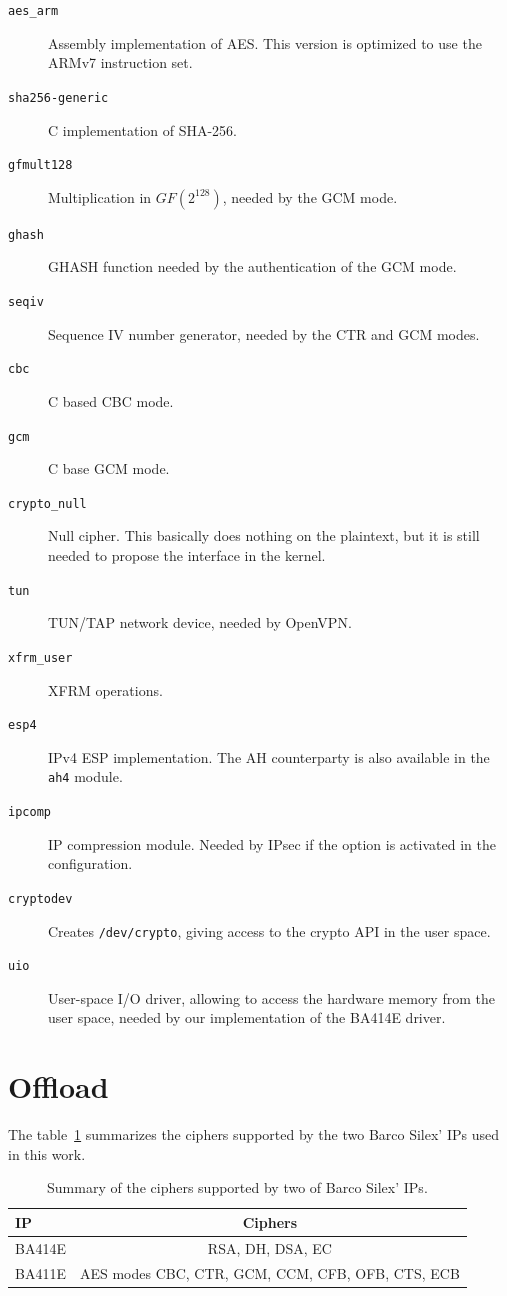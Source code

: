 \begin{description}
	\item[\texttt{aes\_arm}] Assembly implementation of AES. This version is optimized to use the ARMv7 instruction set.
	\item[\texttt{sha256-generic}] C implementation of SHA-256.
	\item[\texttt{gfmult128}] Multiplication in $GF(2^128)$, needed by the GCM mode.
	\item[\texttt{ghash}] GHASH function needed by the authentication of the GCM mode.
	\item[\texttt{seqiv}] Sequence IV number generator, needed by the CTR and GCM modes.
	\item[\texttt{cbc}] C based CBC mode.
	\item[\texttt{gcm}] C base GCM mode.
	\item[\texttt{crypto\_null}] Null cipher. This basically does nothing on the plaintext, but it is still needed to propose the interface in the kernel.
	\item[\texttt{tun}] TUN/TAP network device, needed by OpenVPN.
	\item[\texttt{xfrm\_user}] XFRM operations.
	\item[\texttt{esp4}] IPv4 ESP implementation. The AH counterparty is also available in the \texttt{ah4} module.
	\item[\texttt{ipcomp}] IP compression module. Needed by IPsec if the option is activated in the configuration.
	\item[\texttt{cryptodev}] Creates \texttt{/dev/crypto}, giving access to the crypto API in the user space.
	\item[\texttt{uio}] User-space I/O driver, allowing to access the hardware memory from the user space, needed by our implementation of the BA414E driver.
\end{description}

\section{Offload}

The table~\ref{tab:ip-ciphers} summarizes the ciphers supported by the two Barco Silex' IPs used in this work.

\begin{table}[ht]
\begin{tabular}{|l|c|}\hline
IP & Ciphers \\ \hline
BA414E & RSA, DH, DSA, EC \\ 
BA411E & AES modes CBC, CTR, GCM, CCM, CFB, OFB, CTS, ECB \\ \hline
\end{tabular}
\caption{Summary of the ciphers supported by two of Barco Silex' IPs.}{}
\label{tab:ip-ciphers}
\end{table}

